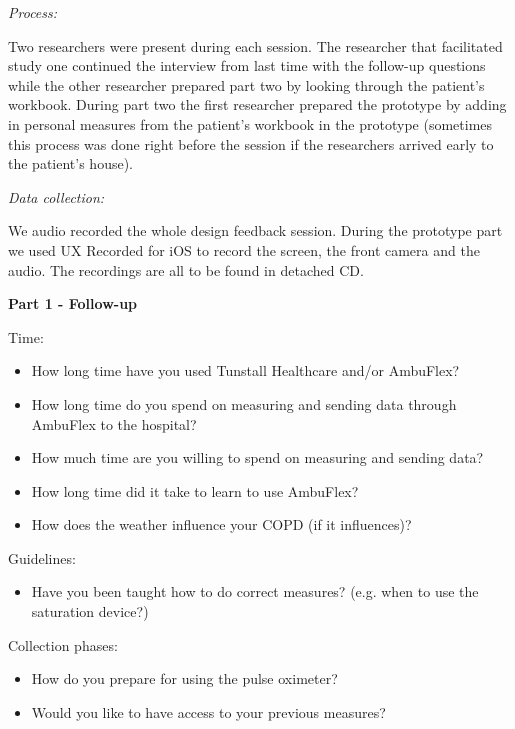 \textit{Process:}

Two researchers were present during each session. The researcher that facilitated study one continued the interview from last time with the follow-up questions while the other researcher prepared part two by looking through the patient's workbook. During part two the first researcher prepared the prototype by adding in personal measures from the patient's workbook in the prototype (sometimes this process was done right before the session if the researchers arrived early to the patient's house).

\textit{Data collection:}

We audio recorded the whole design feedback session. During the prototype part we used UX Recorded for iOS to record the screen, the front camera and the audio. The recordings are all to be found in detached CD.


\textbf{Part 1 - Follow-up}

Time:
\begin{itemize}
\item How long time have you used Tunstall Healthcare and/or AmbuFlex?%
\item How long time do you spend on measuring and sending data through  AmbuFlex to the hospital?%
\item How much time are you willing to spend on measuring and sending data?%
\item How long time did it take to learn to use AmbuFlex?%
\item How does the weather influence your COPD (if it influences)? %
\end{itemize}

Guidelines:
\begin{itemize}
\item Have you been taught how to do correct measures? (e.g. when to use the saturation device?) %
\end{itemize}

Collection phases:
\begin{itemize}
\item How do you prepare for using the pulse oximeter?%
\item Would you like to have access to your previous measures?%
\end{itemize}

